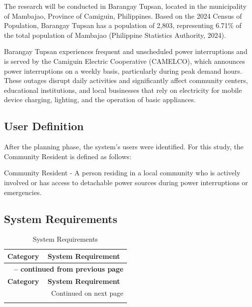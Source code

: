 {The research will be conducted in Barangay Tupsan, located in the municipality of Mambajao, Province of Camiguin, Philippines. Based on the 2024 Census of Population, Barangay Tupsan has a population of 2,803, representing 6.71\% of the total population of Mambajao (Philippine Statistics Authority, 2024).

Barangay Tupsan experiences frequent and unscheduled power interruptions and is served by the Camiguin Electric Cooperative (CAMELCO), which announces power interruptions on a weekly basis, particularly during peak demand hours. These outages disrupt daily activities and significantly affect community centers, educational institutions, and local businesses that rely on electricity for mobile device charging, lighting, and the operation of basic appliances.

\subsection{User Definition}
After the planning phase, the system’s users were identified. For this study, the Community Resident is defined as follows:

Community Resident - A person residing in a local community who is actively involved or has access to detachable power sources during power interruptions or emergencies.

\subsection{System Requirements}

\renewcommand{\arraystretch}{1.5}
\begin{longtable}{| p{4cm} | p{9cm} |}
    \caption{System Requirements} \label{tab:long} \\
    
    \hline 
    \centering \textbf{Category} & \centering \textbf{System Requirement} \tabularnewline \hline 
    \endfirsthead
    
    \multicolumn{2}{c}{{\bfseries \tablename\ \thetable{} -- continued from previous page}} \\ \hline
    \centering \textbf{Category} & \centering \textbf{System Requirement} \tabularnewline \hline 
    \endhead
    
    \hline \multicolumn{2}{|r|}{{\small Continued on next page}} \\ \hline
    \endfoot
    
    \hline
    \endlastfoot
    

\end{longtable}}
